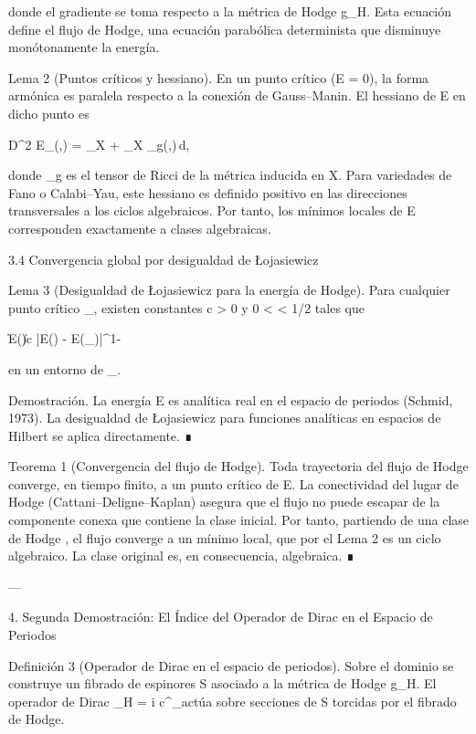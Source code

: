 \documentclass[12pt,twoside]{book}
\begin{document}
donde el gradiente se toma respecto a la métrica de Hodge g_H. Esta ecuación define el flujo de Hodge, una ecuación parabólica determinista que disminuye monótonamente la energía.

Lema 2 (Puntos críticos y hessiano). En un punto crítico (\nabla E = 0), la forma armónica es paralela respecto a la conexión de Gauss–Manin. El hessiano de E en dicho punto es

D^2 E_\alpha(\beta,\beta) = \int_X \nabla\beta \wedge *\nabla\beta + \int_X _g(\beta,\beta)\,d,

donde _g es el tensor de Ricci de la métrica inducida en X. Para variedades de Fano o Calabi–Yau, este hessiano es definido positivo en las direcciones transversales a los ciclos algebraicos. Por tanto, los mínimos locales de E corresponden exactamente a clases algebraicas.

3.4 Convergencia global por desigualdad de Łojasiewicz

Lema 3 (Desigualdad de Łojasiewicz para la energía de Hodge). Para cualquier punto crítico \alpha_\infty, existen constantes c > 0 y 0 < \theta < 1/2 tales que

\|\nabla E(\alpha)\| \ge c |E(\alpha) - E(\alpha_\infty)|^{1-\theta}

en un entorno de \alpha_\infty.

Demostración. La energía E es analítica real en el espacio de periodos (Schmid, 1973). La desigualdad de Łojasiewicz para funciones analíticas en espacios de Hilbert se aplica directamente. ∎

Teorema 1 (Convergencia del flujo de Hodge). Toda trayectoria del flujo de Hodge converge, en tiempo finito, a un punto crítico de E. La conectividad del lugar de Hodge (Cattani–Deligne–Kaplan) asegura que el flujo no puede escapar de la componente conexa que contiene la clase inicial. Por tanto, partiendo de una clase de Hodge \alpha, el flujo converge a un mínimo local, que por el Lema 2 es un ciclo algebraico. La clase original \alpha es, en consecuencia, algebraica. ∎

---

4. Segunda Demostración: El Índice del Operador de Dirac en el Espacio de Periodos

Definición 3 (Operador de Dirac en el espacio de periodos). Sobre el dominio  se construye un fibrado de espinores S asociado a la métrica de Hodge g_H. El operador de Dirac _H = i c^\mu \nabla_\mu actúa sobre secciones de S torcidas por el fibrado de Hodge.
\end{document}
